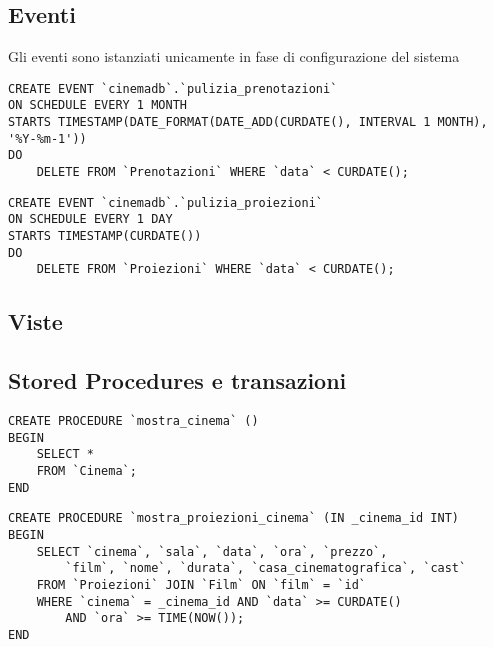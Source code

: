 \pagebreak
\subsection*{Eventi}
%
%

Gli eventi sono istanziati unicamente in fase di configurazione del sistema

\begin{verbatim}
CREATE EVENT `cinemadb`.`pulizia_prenotazioni`
ON SCHEDULE EVERY 1 MONTH
STARTS TIMESTAMP(DATE_FORMAT(DATE_ADD(CURDATE(), INTERVAL 1 MONTH), '%Y-%m-1'))
DO
    DELETE FROM `Prenotazioni` WHERE `data` < CURDATE();
\end{verbatim}

\begin{verbatim}
CREATE EVENT `cinemadb`.`pulizia_proiezioni`
ON SCHEDULE EVERY 1 DAY
STARTS TIMESTAMP(CURDATE())
DO
    DELETE FROM `Proiezioni` WHERE `data` < CURDATE();
\end{verbatim}

\subsection*{Viste}
%
%

\pagebreak
\subsection*{Stored Procedures e transazioni}
%
%

\begin{verbatim}
CREATE PROCEDURE `mostra_cinema` ()
BEGIN
    SELECT *
    FROM `Cinema`;
END
\end{verbatim}

\begin{verbatim}
CREATE PROCEDURE `mostra_proiezioni_cinema` (IN _cinema_id INT)
BEGIN
    SELECT `cinema`, `sala`, `data`, `ora`, `prezzo`,
        `film`, `nome`, `durata`, `casa_cinematografica`, `cast`
    FROM `Proiezioni` JOIN `Film` ON `film` = `id`
    WHERE `cinema` = _cinema_id AND `data` >= CURDATE()
        AND `ora` >= TIME(NOW());
END
\end{verbatim}

